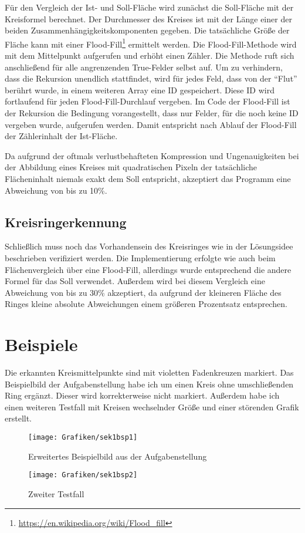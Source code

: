 Für den Vergleich der Ist- und Soll-Fläche wird zunächst die Soll-Fläche mit der Kreisformel berechnet. Der Durchmesser des Kreises ist mit der Länge einer der beiden Zusammenhängigkeitskomponenten gegeben. Die tatsächliche Größe der Fläche kann mit einer Flood-Fill\footnote{\url{https://en.wikipedia.org/wiki/Flood_fill}} ermittelt werden.
Die Flood-Fill-Methode wird mit dem Mittelpunkt aufgerufen und erhöht einen Zähler. Die Methode ruft sich anschließend für alle angrenzenden True-Felder selbst auf. Um zu verhindern, dass die Rekursion unendlich stattfindet, wird für jedes Feld, dass von der "`Flut"' berührt wurde, in einem weiteren Array eine ID gespeichert.
Diese ID wird fortlaufend für jeden Flood-Fill-Durchlauf vergeben. Im Code der Flood-Fill ist der Rekursion die Bedingung vorangestellt, dass nur Felder, für die noch keine ID vergeben wurde, aufgerufen werden. Damit entspricht nach Ablauf der Flood-Fill der Zählerinhalt der Ist-Fläche.

Da aufgrund der oftmals verlustbehafteten Kompression und Ungenauigkeiten bei der Abbildung eines Kreises mit quadratischen Pixeln der tatsächliche Flächeninhalt  niemals exakt dem Soll entspricht, akzeptiert das Programm eine Abweichung von bis zu 10\%. 

\subsection{Kreisringerkennung}
Schließlich muss noch das Vorhandensein des Kreisringes wie in der Lösungsidee beschrieben verifiziert werden. Die Implementierung erfolgte wie auch beim Flächenvergleich über eine Flood-Fill, allerdings wurde entsprechend die andere Formel für das Soll verwendet. Außerdem wird bei diesem Vergleich eine Abweichung von bis zu 30\% akzeptiert, da aufgrund der kleineren Fläche des Ringes kleine absolute Abweichungen einem größeren Prozentsatz entsprechen.

\pagebreak
\section{Beispiele}
Die erkannten Kreismittelpunkte sind mit violetten Fadenkreuzen markiert. Das Beispielbild der Aufgabenstellung habe ich um einen Kreis ohne umschließenden Ring ergänzt. Dieser wird korrekterweise nicht markiert. Außerdem habe ich einen weiteren Testfall mit Kreisen wechselnder Größe und einer störenden Grafik erstellt.
\begin{figure}[!ht]
	\centering	
	\texttt{[image: Grafiken/sek1bsp1]}
	\caption{Erweitertes Beispielbild aus der Aufgabenstellung}
\end{figure}
\vfill{}
\begin{figure}[!ht]
	\centering	
	\texttt{[image: Grafiken/sek1bsp2]}
	\caption{Zweiter Testfall}
\end{figure}
